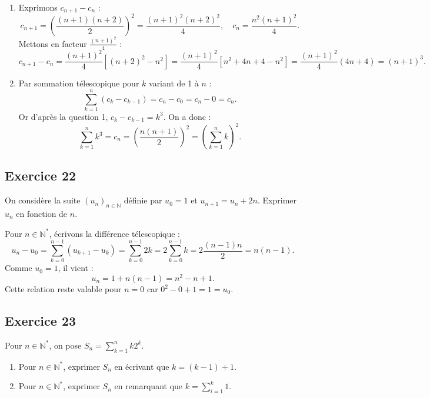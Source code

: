 \documentclass[11pt,a4paper]{article}
\newcommand{\N}{\mathbb{N}}
\begin{document}
\begin{correctionbox}
\begin{enumerate}
    \item Exprimons $c_{n+1} - c_n$ :
    \[
    c_{n+1} = \left(\frac{(n+1)(n+2)}{2}\right)^2 = \frac{(n+1)^2(n+2)^2}{4}, \quad c_n = \frac{n^2(n+1)^2}{4}.
    \]
    Mettons en facteur $\frac{(n+1)^2}{4}$ :
    \[
    c_{n+1} - c_n = \frac{(n+1)^2}{4} \left[(n+2)^2 - n^2\right] = \frac{(n+1)^2}{4} \left[n^2 + 4n + 4 - n^2\right] = \frac{(n+1)^2}{4} (4n+4) = (n+1)^3.
    \]
    \item Par sommation télescopique pour $k$ variant de 1 à $n$ :
    \[
    \sum_{k=1}^n (c_k - c_{k-1}) = c_n - c_0 = c_n - 0 = c_n.
    \]
    Or d'après la question 1, $c_k - c_{k-1} = k^3$. On a donc :
    \[
    \sum_{k=1}^n k^3 = c_n = \left(\frac{n(n+1)}{2}\right)^2 = \left(\sum_{k=1}^n k\right)^2.
    \]
\end{enumerate}
\end{correctionbox}

\subsection*{Exercice 22}
On considère la suite $(u_n)_{n \in \N}$ définie par $u_0 = 1$ et $u_{n+1} = u_n + 2n$. Exprimer $u_n$ en fonction de $n$.

\begin{correctionbox}
Pour $n \in \N^*$, écrivons la différence télescopique :
\[
u_n - u_0 = \sum_{k=0}^{n-1} (u_{k+1} - u_k) = \sum_{k=0}^{n-1} 2k = 2 \sum_{k=0}^{n-1} k = 2 \frac{(n-1)n}{2} = n(n-1).
\]
Comme $u_0 = 1$, il vient :
\[
u_n = 1 + n(n-1) = n^2 - n + 1.
\]
Cette relation reste valable pour $n=0$ car $0^2 - 0 + 1 = 1 = u_0$.
\end{correctionbox}

\subsection*{Exercice 23}
Pour $n \in \N^*$, on pose $S_n = \sum_{k=1}^n k 2^k$.
\begin{enumerate}
    \item Pour $n \in \N^*$, exprimer $S_n$ en écrivant que $k = (k-1) + 1$.
    \item Pour $n \in \N^*$, exprimer $S_n$ en remarquant que $k = \sum_{i=1}^k 1$.
\end{enumerate}
\end{document}
